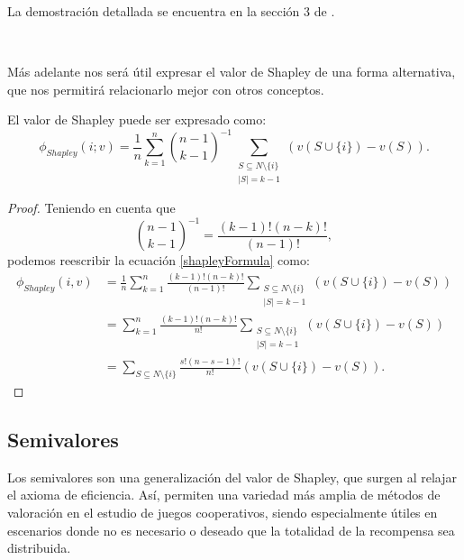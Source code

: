 La demostración detallada se encuentra en la sección 3
de \cite{shapleyValue}.

\

Más adelante nos será útil expresar el valor de Shapley de
una forma alternativa, que nos permitirá relacionarlo mejor
con otros conceptos.

\begin{proposition}
  El valor de Shapley puede ser expresado como:
  \begin{equation}
    \label{shapleyFormula}
    \phi_{Shapley}(i;v)=\frac{1}{n}\sum_{k=1}^n \binom{n-1}{k-1}^{-1} 
    \sum_{\substack{S \subseteq N \setminus \{i\} \\ |S|=k-1}}(v(S\cup\{i\})-v(S)).
  \end{equation}
\end{proposition}

\begin{proof}
  Teniendo en cuenta que
  \[
  \binom{n-1}{k-1}^{-1} = \frac{(k-1)!(n-k)!}{(n-1)!},
  \]
  podemos reescribir la ecuación \ref{shapleyFormula} como:
  \begin{align*}
    \phi_{Shapley}(i,v) &= \frac{1}{n} \sum_{k=1}^{n} \frac{(k-1)!(n-k)!}{(n-1)!}
    \sum_{\substack{S \subseteq N \setminus \{i\} \\ |S|=k-1}}(v(S\cup\{i\})-v(S))\\
    &= \sum_{k=1}^{n} \frac{(k-1)!(n-k)!}{n!}
    \sum_{\substack{S \subseteq N \setminus \{i\} \\ |S|=k-1}}(v(S\cup\{i\})-v(S))\\
    & = \sum_{S\subseteq N \setminus \{i\}} \frac{s!(n-s-1)!}
    {n!}(v(S\cup \{i\})-v(S)).
  \end{align*}

\end{proof}



\subsection{Semivalores}

Los semivalores son una generalización del valor de Shapley,
que surgen al relajar el axioma de eficiencia. Así, permiten
una variedad más amplia de métodos de valoración en el estudio
de juegos cooperativos, siendo especialmente útiles en escenarios
donde no es necesario o deseado que la totalidad de la recompensa
sea distribuida. 

